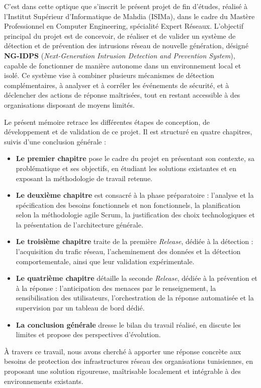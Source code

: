 C'est dans cette optique que s'inscrit le présent projet de fin d'études, réalisé à l'Institut Supérieur d'Informatique de Mahdia (ISIMa), dans le cadre du Mastère Professionnel en Computer Engineering, spécialité Expert Réseaux. L'objectif principal du projet est de concevoir, de réaliser et de valider un système de détection et de prévention des intrusions réseau de nouvelle génération, désigné \textbf{NG-IDPS} (\textit{Next-Generation Intrusion Detection and Prevention System}), capable de fonctionner de manière autonome dans un environnement local et isolé. Ce système vise à combiner plusieurs mécanismes de détection complémentaires, à analyser et à corréler les événements de sécurité, et à déclencher des actions de réponse maîtrisées, tout en restant accessible à des organisations disposant de moyens limités.

Le présent mémoire retrace les différentes étapes de conception, de développement et de validation de ce projet. Il est structuré en quatre chapitres, suivis d'une conclusion générale :

\begin{itemize}
    \item \textbf{Le premier chapitre} pose le cadre du projet en présentant son contexte, sa problématique et ses objectifs, en étudiant les solutions existantes et en exposant la méthodologie de travail retenue.

    \item \textbf{Le deuxième chapitre} est consacré à la phase préparatoire : l'analyse et la spécification des besoins fonctionnels et non fonctionnels, la planification selon la méthodologie agile Scrum, la justification des choix technologiques et la présentation de l'architecture générale.

    \item \textbf{Le troisième chapitre} traite de la première \textit{Release}, dédiée à la détection : l'acquisition du trafic réseau, l'acheminement des données et la détection comportementale, ainsi que leur validation expérimentale.

    \item \textbf{Le quatrième chapitre} détaille la seconde \textit{Release}, dédiée à la prévention et à la réponse : l'anticipation des menaces par le renseignement, la sensibilisation des utilisateurs, l'orchestration de la réponse automatisée et la supervision par un tableau de bord dédié.

    \item \textbf{La conclusion générale} dresse le bilan du travail réalisé, en discute les limites et propose des perspectives d'évolution.
\end{itemize}

À travers ce travail, nous avons cherché à apporter une réponse concrète aux besoins de protection des infrastructures réseau des organisations tunisiennes, en proposant une solution rigoureuse, maîtrisable localement et intégrable à des environnements existants.